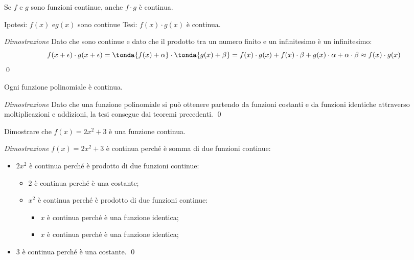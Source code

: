 \begin{teorema}
Se \(f\) e \(g\) sono funzioni continue, anche \(f \cdot g\) è continua.
\end{teorema}

\noindent Ipotesi: 
\(f(x) \text{ e} g(x)\) sono continue
\tab Tesi: 
\(f(x) \cdot g(x)\) è continua.

\emph{Dimostrazione}
Dato che sono continue e dato che il prodotto tra un numero finito e un 
infinitesimo è un infinitesimo: 
\[f(x+\epsilon) \cdot g(x+\epsilon) = 
\tonda{f(x)+\alpha} \cdot \tonda{g(x)+\beta} = 
f(x) \cdot g(x) + f(x) \cdot \beta + g(x) \cdot \alpha + \alpha \cdot \beta
\approx f(x) \cdot g(x)\]
\qed

\begin{corollario}
 Ogni funzione polinomiale è continua.
\end{corollario}

\emph{Dimostrazione}
Dato che una funzione polinomiale si può ottenere partendo da funzioni 
costanti e da funzioni identiche attraverso moltiplicazioni e addizioni, 
la tesi consegue dai teoremi precedenti. \qed

\begin{esempio}
 Dimostrare che \(f(x)=2x^2 + 3\) è una funzione continua.

\emph{Dimostrazione}
\(f(x)=2x^2 + 3\) è continua perché è somma di due funzioni continue: 
 \begin{itemize}[nosep]
  \item \(2x^2\) è continua perché è prodotto di due funzioni continue:
  \begin{itemize}[nosep]
   \item \(2\) è continua perché è una costante;
   \item \(x^2\) è continua perché è prodotto di due funzioni continue:
   \begin{itemize}[nosep]
    \item \(x\) è continua perché è una funzione identica;
    \item \(x\) è continua perché è una funzione identica;
   \end{itemize}
  \end{itemize}
  \item \(3\) è continua perché è una costante. \qed
 \end{itemize}


\end{esempio}

